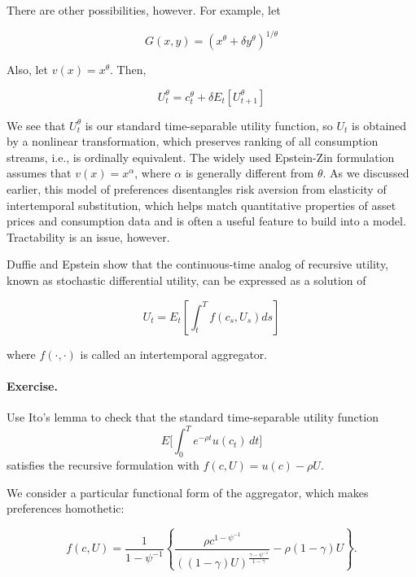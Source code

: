 \documentclass[\topdir/lecture\_notes.tex]{subfiles}
\begin{document}
There are other possibilities, however. For example, let

\begin{equation}
G(x, y)=\left(x^{\theta}+\delta y^{\theta}\right)^{1 / \theta}
\end{equation}

Also, let \(v(x)=x^{\theta}\). Then,

\begin{equation}
U_{t}^{\theta}=c_{t}^{\theta}+\delta E_{t}\left[U_{t+1}^{\theta}\right]
\end{equation}

We see that \(U_{t}^{\theta}\) is our standard time-separable utility function, so \(U_{t}\) is obtained by a nonlinear transformation, which preserves ranking of all consumption streams, i.e., is ordinally equivalent. The widely used Epstein-Zin formulation assumes that \(v(x)=x^{\alpha}\), where \(\alpha\) is generally different from \(\theta\). As we discussed earlier, this model of preferences disentangles risk aversion from elasticity of intertemporal substitution, which helps match quantitative properties of asset prices and consumption data and is often a useful feature to build into a model. Tractability is an issue, however.

Duffie and Epstein show that the continuous-time analog of recursive utility, known as stochastic differential utility, can be expressed as a solution of

\begin{equation}
U_{t}=E_{t}\left[\int_{t}^{T} f\left(c_{s}, U_{s}\right) d s\right]
\end{equation}

where \(f(\cdot, \cdot)\) is called an intertemporal aggregator.

\paragraph{Exercise.} Use Ito's lemma to check that the standard time-separable utility function
\[
E\Bigg[\int_{0}^{T} e^{-\rho t} u(c_{t}) \, d t\Bigg]
\]
satisfies the recursive formulation with \(f(c, U)=u(c)-\rho U\).

We consider a particular functional form of the aggregator, which makes preferences homothetic:

\begin{equation}
f(c, U)=\frac{1}{1-\psi^{-1}}\left\{\frac{\rho c^{1-\psi^{-1}}}{((1-\gamma) U)^{\frac{\gamma-\psi^{-1}}{1-\gamma}}}-\rho(1-\gamma) U\right\} .
\end{equation}
\end{document}
